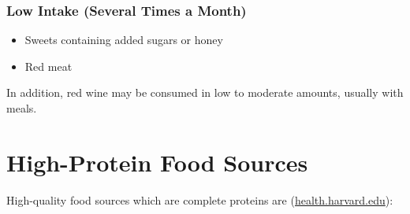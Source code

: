 \documentclass[8pt]{extarticle}
\begin{document}
\subsubsection{Low Intake (Several Times a Month)}
\begin{itemize}
    \item Sweets containing added sugars or honey
    \item Red meat
\end{itemize}

In addition, red wine may be consumed in low to moderate amounts, usually with meals.


\section{High-Protein Food Sources}

High-quality food sources which are complete proteins are (\href{https://www.health.harvard.edu/nutrition/high-protein-foods-the-best-protein-sources-to-include-in-a-healthy-diet#:~:text=Try%20to%20eat%20a%20variety,quality%20protein%20sources}{health.harvard.edu}): 
\end{document}
